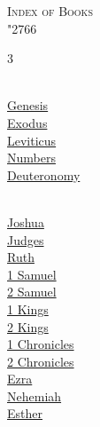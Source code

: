 \onecolumn
\thispagestyle{empty}
\hypertarget{toc}{}
\vspace*{20pt}
{\centering\huge\booktitlefont\scshape Index of Books\\\char"2766\par}
\vspace{10pt}
\begin{multicols}{3}
\small
\setlength{\parskip}{0pt}
\setlength{\parindent}{0pt}

\\
\hspace{1em}\hyperlink{book-genesis}{Genesis}\\
\hspace{1em}\hyperlink{book-exodus}{Exodus}\\
\hspace{1em}\hyperlink{book-leviticus}{Leviticus}\\
\hspace{1em}\hyperlink{book-numbers}{Numbers}\\
\hspace{1em}\hyperlink{book-deuteronomy}{Deuteronomy}\\
\vspace{4pt}

\\
\hspace{1em}\hyperlink{book-joshua}{Joshua}\\
\hspace{1em}\hyperlink{book-judges}{Judges}\\
\hspace{1em}\hyperlink{book-ruth}{Ruth}\\
\hspace{1em}\hyperlink{book-1samuel}{1 Samuel}\\
\hspace{1em}\hyperlink{book-2samuel}{2 Samuel}\\
\hspace{1em}\hyperlink{book-1kings}{1 Kings}\\
\hspace{1em}\hyperlink{book-2kings}{2 Kings}\\
\hspace{1em}\hyperlink{book-1chronicles}{1 Chronicles}\\
\hspace{1em}\hyperlink{book-2chronicles}{2 Chronicles}\\
\hspace{1em}\hyperlink{book-ezra}{Ezra}\\
\hspace{1em}\hyperlink{book-nehemiah}{Nehemiah}\\
\hspace{1em}\hyperlink{book-esther}{Esther}\\
\vspace{4pt}


\end{multicols}
